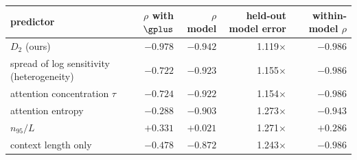 \begin{tabular}{@{}lrrrr@{}}
\toprule
predictor & $\rho$ with $\gplus$ & $\rho$ \textbar{} model & held-out model error & within-model $\rho$ \\
\midrule
$D_2$ (ours) & $-0.978$ & $-0.942$ & 1.119$\times$ & $-0.986$ \\
spread of log sensitivity (heterogeneity) & $-0.722$ & $-0.923$ & 1.155$\times$ & $-0.986$ \\
attention concentration $\tau$ & $-0.724$ & $-0.922$ & 1.154$\times$ & $-0.986$ \\
attention entropy & $-0.288$ & $-0.903$ & 1.273$\times$ & $-0.943$ \\
$n_{95}/L$ & $+0.331$ & $+0.021$ & 1.271$\times$ & $+0.286$ \\
context length only & $-0.478$ & $-0.872$ & 1.243$\times$ & $-0.986$ \\
\bottomrule
\end{tabular}
